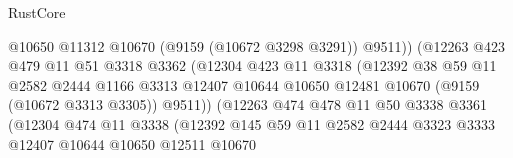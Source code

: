 \begin{lexlean}{RustCore}
\begin{coremodule}
                                        @10650
                                        @11312
                                        @10670
                                        (@9159 (@10672 @3298 @3291))
                                        @9511))
                                    (@12263
                                      @423
                                      @479
                                      @11
                                      @51
                                      @3318
                                      @3362
                                      (@12304
                                        @423
                                        @11
                                        @3318
                                        (@12392
                                          @38
                                          @59
                                          @11
                                          @2582
                                          @2444
                                          @1166
                                          @3313
                                          @12407
                                          @10644
                                          @10650
                                          @12481
                                          @10670
                                          (@9159 (@10672 @3313 @3305))
                                          @9511))
                                      (@12263
                                        @474
                                        @478
                                        @11
                                        @50
                                        @3338
                                        @3361
                                        (@12304
                                          @474
                                          @11
                                          @3338
                                          (@12392
                                            @145
                                            @59
                                            @11
                                            @2582
                                            @2444
                                            @3323
                                            @3333
                                            @12407
                                            @10644
                                            @10650
                                            @12511
                                            @10670

\end{coremodule}
\end{lexlean}
